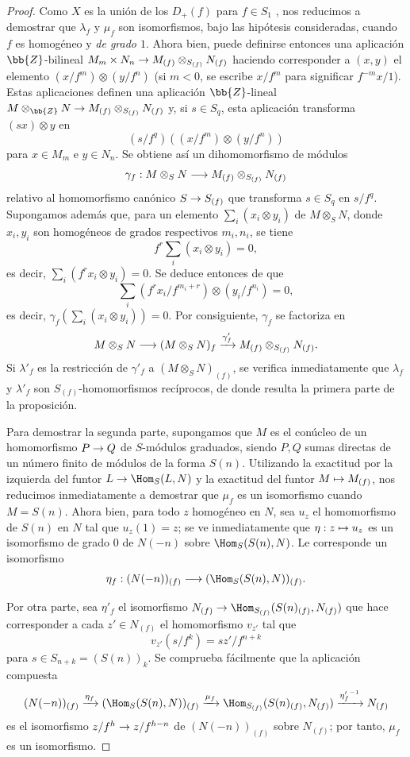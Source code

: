 \documentclass[oneside,10pt]{amsart}
\makeatletter
\newcommand{\ega@arrow}[2]{\mathchoice{#1}{#2}{#2}{#2}}
\let\ega@shortmapsto\mapsto
\renewcommand{\to}{\ega@arrow{\longrightarrow}{\rightarrow}}
\renewcommand{\mapsto}{\ega@arrow{\longmapsto}{\ega@shortmapsto}}
\newcommand{\oldpage}[2][]{\marginnote{\normalfont\footnotesize\textbf{#1}~|~#2}\ignorespaces}
\makeatother
\begin{document}
\begin{proof}
Como $X$ es la unión de los $D_+(f)$ para $f\in S_1$ , nos reducimos a demostrar que $\lambda_f$ y $\mu_f$ son isomorfismos, bajo las hipótesis consideradas, cuando $f$ es homogéneo y \emph{de grado $1$}.
Ahora bien, puede definirse entonces una aplicación $\bb{Z}$-bilineal $M_m\times N_n\to M_{(f)}\otimes_{S_{(f)}}N_{(f)}$ haciendo corresponder a $(x,y)$ el elemento $(x/f^m)\otimes(y/f^n)$ (si $m<0$, se escribe $x/f^m$ para significar $f^{-m}x/1$).
Estas aplicaciones definen una aplicación $\bb{Z}$-lineal $M\otimes_\bb{Z}N\to M_{(f)}\otimes_{S_{(f)}}N_{(f)}$ y, si $s\in S_q$, esta aplicación transforma $(sx)\otimes y$ en
\[
  (s/f^q)((x/f^m)\otimes(y/f^n))
\]
para $x\in M_m$ e $y\in N_n$.
Se obtiene así un dihomomorfismo de módulos
\[
  \gamma_f:M\otimes_S N\to M_{(f)}\otimes_{S_{(f)}}N_{(f)}
\]
relativo al homomorfismo canónico $S\to S_{(f)}$ que transforma $s\in S_q$ en $s/f^q$.
Supongamos además que, para un elemento $\sum_i(x_i\otimes y_i)$ de $M\otimes_S N$, donde $x_i,y_i$ son homogéneos de grados respectivos $m_i,n_i$, se tiene
\[
  f^r\sum_i(x_i\otimes y_i)=0,
\]
es decir, $\sum_i(f^rx_i\otimes y_i)=0$.
Se deduce entonces de  que
\[
  \sum_i(f^rx_i/f^{m_i+r})\otimes(y_i/f^{n_i})=0,
\]
es decir, $\gamma_f(\sum_i(x_i\otimes y_i))=0$.
Por consiguiente, $\gamma_f$ se factoriza en
\[
  M\otimes_S N\to(M\otimes_S N)_f
  \xrightarrow{\gamma'_f}M_{(f)}\otimes_{S_{(f)}}N_{(f)}.
\]
Si $\lambda'_f$ es la restricción de $\gamma'_f$
\oldpage[II]{35}
a $(M\otimes_S N)_{(f)}$, se verifica inmediatamente que $\lambda_f$ y $\lambda'_f$ son $S_{(f)}$-homomorfismos recíprocos, de donde resulta la primera parte de la proposición.

Para demostrar la segunda parte, supongamos que $M$ es el conúcleo de un homomorfismo $P\to Q$ de $S$-módulos graduados, siendo $P,Q$ sumas directas de un número finito de módulos de la forma $S(n)$.
Utilizando la exactitud por la izquierda del funtor $L\to\Hom_S(L,N)$ y la exactitud del funtor $M\mapsto M_{(f)}$, nos reducimos inmediatamente a demostrar que $\mu_f$ es un isomorfismo cuando $M=S(n)$.
Ahora bien, para todo $z$ homogéneo en $N$, sea $u_z$ el homomorfismo de $S(n)$ en $N$ tal que $u_z(1)=z$; se ve inmediatamente que $\eta:z\mapsto u_z$ es un isomorfismo de grado $0$ de $N(-n)$ sobre $\Hom_S(S(n),N)$.
Le corresponde un isomorfismo
\[
  \eta_f:(N(-n))_{(f)}\to(\Hom_S(S(n),N))_{(f)}.
\]

Por otra parte, sea $\eta'_f$ el isomorfismo $N_{(f)}\to\Hom_{S_{(f)}}(S(n)_{(f)},N_{(f)})$ que hace corresponder a cada $z'\in N_{(f)}$ el homomorfismo $v_{z'}$ tal que
\[
  v_{z'}(s/f^k)=sz'/f^{n+k}
\]
para $s\in S_{n+k}=(S(n))_k$.
Se comprueba fácilmente que la aplicación compuesta
\[
  (N(-n))_{(f)}
  \xrightarrow{\eta_f}(\Hom_S(S(n),N))_{(f)}
  \xrightarrow{\mu_f}\Hom_{S_{(f)}}(S(n)_{(f)},N_{(f)})
  \xrightarrow{{\eta'_f}^{-1}}N_{(f)}
\]
es el isomorfismo $z/f^h\to z/f^{h-n}$ de $(N(-n))_{(f)}$ sobre $N_{(f)}$; por tanto, $\mu_f$ es un isomorfismo.
\end{proof}
\end{document}
